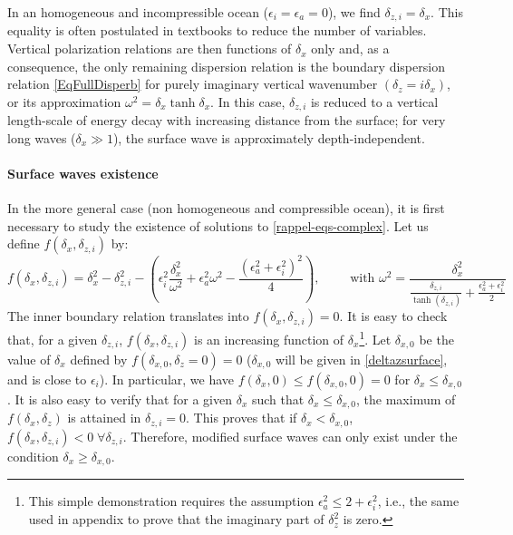 In an homogeneous and incompressible ocean ($\epsilon_i=\epsilon_a=0$), we find $\delta_{z,i}=\delta_x$. This equality is often postulated in textbooks to reduce the number of variables. Vertical polarization relations are then functions of $\delta_x$ only \citep{gill_1982} and, as a consequence, the only remaining dispersion relation is the boundary dispersion relation \ref{EqFullDisperb} for purely imaginary vertical wavenumber $(\delta_z=i\delta_x)$, or its approximation  $\omega^2=\delta_x \tanh \delta_x$. In this case, $\delta_{z,i}$ is reduced to a vertical length-scale of energy decay with increasing distance from the surface; for very long waves ($\delta_x \gg 1$), the surface wave is approximately depth-independent.
%
\paragraph{Surface waves existence} In the more general case (non homogeneous and compressible ocean), it is first necessary to study the existence of solutions to \ref{rappel-eqs-complex}. Let us define
$f(\delta_x, \delta_{z,i})$ by:
\[
f(\delta_x, \delta_{z,i})=\delta_x^2-\delta_{z,i}^2-\left(
\epsilon_i^2\frac{\delta_x^2}
{\omega^2}+\epsilon_a^2\omega^2-\frac{(\epsilon_a^2+\epsilon_i^2)^2}{4}
\right),
\qquad \mbox{ with }\omega^2=\frac{\delta_x^2}
{\frac{\delta_{z,i}}{\tanh(\delta_{z,i})}+\frac{\epsilon_a^2+\epsilon_i^2}{2}}
\]
The inner boundary relation translates into $f(\delta_x,\delta_{z,i})=0$. It is easy to check that, for a given $\delta_{z,i}$, $f(\delta_x,\delta_{z,i})$ is an increasing function of $\delta_x$\footnote{This simple demonstration requires the assumption $\epsilon_a^2 \le 2 + \epsilon_i^2$, i.e., the same used in appendix to prove that the imaginary part of $\delta_z^2$ is zero.}. Let $\delta_{x,0}$ be the value of $\delta_x$ defined by $f(\delta_{x,0},\delta_z=0)=0$ ($\delta_{x,0}$ will be given in \ref{deltazsurface}, and is close to $\epsilon_i$).
In particular, we have $f(\delta_x,0)\le f(\delta_{x,0},0)=0$ for $\delta_x \le \delta_{x,0}$. It is also easy to verify that for a given $\delta_x$ such that $\delta_x \le \delta_{x,0}$, the maximum of $f(\delta_x,\delta_z)$ is attained in $\delta_{z,i}=0$. This proves that if $\delta_x < \delta_{x,0}$, $f(\delta_x,\delta_{z,i}) < 0\; \forall \delta_{z,i}$. Therefore, modified surface waves can only exist under the condition $\delta_x \ge \delta_{x,0}$.
%
